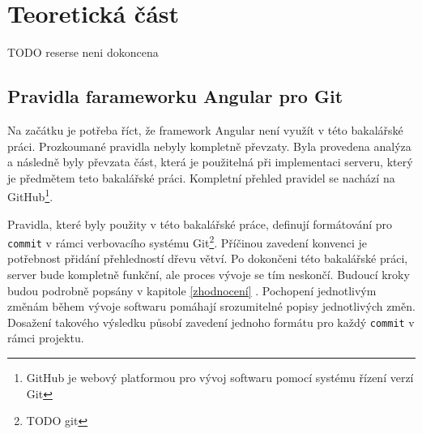 \chapter{Teoretická část}\label{resere}
TODO reserse neni dokoncena
\section{Pravidla farameworku Angular pro Git}\label{reserse:git}
    Na začátku je potřeba říct, že framework Angular není využít v této bakalářské práci. Prozkoumané pravidla nebyly kompletně převzaty. Byla provedena analýza a následně byly převzata část, která
    je použitelná při implementaci serveru, který je předmětem teto bakalářské práci. Kompletní přehled pravidel se nachází na GitHub\footnote{ GitHub je webový platformou pro vývoj softwaru pomocí systému řízení verzí Git}\cite{angular-git}.
    
    Pravidla, které byly použity v této bakalářské práce, definují formátování pro \verb|commit| v rámci verbovacího systému Git\footnote{TODO git}. Příčinou zavedení konvenci je potřebnost přidání přehledností dřevu větví. Po dokončeni této bakalářské práci, server bude kompletně funkční, ale proces vývoje se tím neskončí. Budoucí kroky budou podrobně popsány v kapitole \ref{zhodnocení} . Pochopení jednotlivým změnám během vývoje softwaru pomáhají srozumitelné popisy jednotlivých změn. Dosažení takového výsledku působí zavedení jednoho formátu pro každý \verb|commit| v rámci projektu.
    
